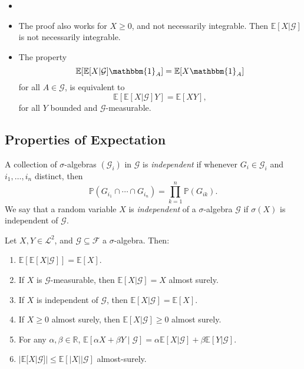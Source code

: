 \documentclass[12pt]{article}
\begin{document}

\begin{remark}
	\begin{itemize}
		\item[]
		\item The proof also works for $X \geq 0$, and not necessarily integrable. Then $\mathbb{E}[X | \mathcal{G}]$ is not necessarily integrable.
		\item The property
			\[
			\mathbb{E}[\mathbb{E}[X|\mathcal{G}]\mathbbm{1}_{A}] = \mathbb{E}[X \mathbbm{1}_{A}]
			\]
			for all $A \in \mathcal{G}$, is equivalent to
			\[
			\mathbb{E}[\mathbb{E}[X|\mathcal{G}]Y] = \mathbb{E}[XY],
			\]
			for all $Y$ bounded and $\mathcal{G}$-measurable.
	\end{itemize}
\end{remark}

\subsection{Properties of Expectation}%
\label{sub:eepy}

\begin{definition}
	A collection of $\sigma$-algebras $(\mathcal{G}_i)$ in $\mathcal{G}$ is \emph{independent} if whenever $G_i \in \mathcal{G}_i$ and $i_1, \ldots, i_n$ distinct, then
	\[
	\mathbb{P}(G_{i_1} \cap \cdots \cap G_{i_n}) = \prod_{k = 1}^n \mathbb{P}(G_{ik}).
	\]
	We say that a random variable $X$ is \emph{independent} of a $\sigma$-algebra $\mathcal{G}$ if $\sigma(X)$ is independent of $\mathcal{G}$.
\end{definition}

\begin{proposition}
	Let $X, Y \in \mathcal{L}^2$, and $\mathcal{G} \subseteq \mathcal{F}$ a $\sigma$-algebra. Then:
	\begin{enumerate}[\normalfont(i)]
		\item $\mathbb{E}[\mathbb{E}[X|\mathcal{G}]] = \mathbb{E}[X]$.
		\item If $X$ is $\mathcal{G}$-measurable, then $\mathbb{E}[X|\mathcal{G}] = X$ almost surely.
		\item If $X$ is independent of $\mathcal{G}$, then $\mathbb{E}[X|\mathcal{G}] = \mathbb{E}[X]$.
		\item If $X \geq 0$ almost surely, then $\mathbb{E}[X|\mathcal{G}] \geq 0$ almost surely.
		\item For any $\alpha, \beta \in \mathbb{R}$, $\mathbb{E}[\alpha X + \beta Y \mid \mathcal{G}] = \alpha \mathbb{E}[X|\mathcal{G}] + \beta \mathbb{E}[Y|\mathcal{G}]$.
		\item $|\mathbb{E}[X|\mathcal{G}]| \leq \mathbb{E}[|X||\mathcal{G}]$ almost-surely.
	\end{enumerate}
\end{proposition}
\end{document}
